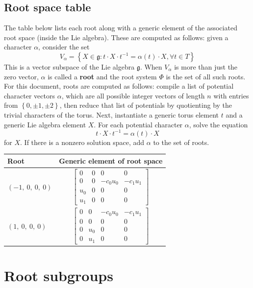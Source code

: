 \documentclass[11pt]{article}
\newcommand{\noi}{\noindent}
\newcommand{\tbf}{\textbf}
\newcommand{\inv}{^{-1}}
\newcommand{\lb}{\left\{}
\newcommand{\rb}{\right\}}
\newcommand{\frakg}{\mathfrak{g}}
\theoremstyle{definition}
\begin{document}
\subsection{Root space table}

\noi The table below lists each root along with a generic element of the associated root space (inside the Lie algebra). These are computed as follows: given a character $\alpha$, consider the set
\[
	V_\alpha = \lb X \in \frakg : t \cdot X \cdot t \inv = \alpha(t) \cdot X, \forall t \in T \rb
\]
This is a vector subspace of the Lie algebra $\frakg$. When $V_\alpha$ is more than just the zero vector, $\alpha$ is called a \tbf{root} and the root system $\Phi$ is the set of all such roots. For this document, roots are computed as follows: compile a list of potential character vectors $\alpha$, which are all possible integer vectors of length $n$ with entries from $\lb 0, \pm 1, \pm 2 \rb$, then reduce that list of potentials by quotienting by the trivial characters of the torus. Next, instantiate a generic torus element $t$ and a generic Lie algebra element $X$. For each potential character $\alpha$, solve the equation
\[
	t \cdot X \cdot t \inv = \alpha(t) \cdot X
\]
for $X$. If there is a nonzero solution space, add $\alpha$ to the set of roots.

\bigskip

\noindent \begin{longtable}{|l|c|}
    \hline
    \textbf{Root} & \textbf{Generic element of root space} \\
    \hline
    \endhead
    $\left( -1, \  0, \  0, \  0\right)$ & ${\left[\begin{matrix}0 & 0 & 0 & 0\\0 & 0 & - c_{0} u_{0} & - c_{1} u_{1}\\u_{0} & 0 & 0 & 0\\u_{1} & 0 & 0 & 0\end{matrix}\right]}$ \\
    \hline
    $\left( 1, \  0, \  0, \  0\right)$ & ${\left[\begin{matrix}0 & 0 & - c_{0} u_{0} & - c_{1} u_{1}\\0 & 0 & 0 & 0\\0 & u_{0} & 0 & 0\\0 & u_{1} & 0 & 0\end{matrix}\right]}$ \\
    \hline
\end{longtable}


\newpage
\section{Root subgroups}
\end{document}
